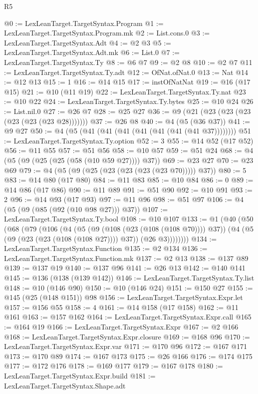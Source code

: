 \begin{lexlean}{R5}
\begin{coremodule}
@0 := LexLeanTarget.TargetSyntax.Program
@1 := LexLeanTarget.TargetSyntax.Program.mk
@2 := List.cons.{0}
@3 := LexLeanTarget.TargetSyntax.Adt
@4 := @2 @3
@5 := LexLeanTarget.TargetSyntax.Adt.mk
@6 := List.{0}
@7 := LexLeanTarget.TargetSyntax.Ty
@8 := @6 @7
@9 := @2 @8
@10 := @2 @7
@11 := LexLeanTarget.TargetSyntax.Ty.adt
@12 := OfNat.ofNat.{0}
@13 := Nat
@14 := @12 @13
@15 := 1
@16 := @14 @15
@17 := instOfNatNat
@19 := @16 (@17 @15)
@21 := @10 (@11 @19)
@22 := LexLeanTarget.TargetSyntax.Ty.nat
@23 := @10 @22
@24 := LexLeanTarget.TargetSyntax.Ty.bytes
@25 := @10 @24
@26 := List.nil.{0}
@27 := @26 @7
@28 := @25 @27
@36 := @9 (@21 (@23 (@23 (@23 (@23 (@23 (@23 @28)))))))
@37 := @26 @8
@40 := @4 (@5 (@36 @37))
@41 := @9 @27
@50 := @4 (@5 (@41 (@41 (@41 (@41 (@41 (@41 (@41 @37))))))))
@51 := LexLeanTarget.TargetSyntax.Ty.option
@52 := 3
@55 := @14 @52 (@17 @52)
@56 := @11 @55
@57 := @51 @56
@58 := @10 @57
@59 := @51 @24
@68 := @4 (@5 (@9 (@25 (@25 (@58 (@10 @59 @27)))) @37))
@69 := @23 @27
@70 := @23 @69
@79 := @4 (@5 (@9 (@25 (@23 (@23 (@23 (@23 @70))))) @37))
@80 := 5
@83 := @14 @80 (@17 @80)
@84 := @11 @83
@85 := @10 @84
@86 := 0
@89 := @14 @86 (@17 @86)
@90 := @11 @89
@91 := @51 @90
@92 := @10 @91
@93 := 2
@96 := @14 @93 (@17 @93)
@97 := @11 @96
@98 := @51 @97
@106 := @4 (@5 (@9 (@85 (@92 (@10 @98 @27))) @37))
@107 := LexLeanTarget.TargetSyntax.Ty.bool
@108 := @10 @107
@133 := @1
    (@40
      (@50
        (@68
          (@79
            (@106
              (@4
                (@5 (@9 (@108 (@23 (@108 (@108 @70)))) @37))
                (@4 (@5 (@9 (@23 (@23 (@108 (@108 @27)))) @37)) (@26 @3))))))))
@134 := LexLeanTarget.TargetSyntax.Function
@135 := @2 @134
@136 := LexLeanTarget.TargetSyntax.Function.mk
@137 := @2 @13
@138 := @137 @89
@139 := @137 @19
@140 := @137 @96
@141 := @26 @13
@142 := @140 @141
@145 := @136 (@138 (@139 @142))
@146 := LexLeanTarget.TargetSyntax.Ty.list
@148 := @10 (@146 @90)
@150 := @10 (@146 @24)
@151 := @150 @27
@155 := @145 (@25 (@148 @151)) @98
@156 := LexLeanTarget.TargetSyntax.Expr.let
@157 := @156 @55
@158 := 4
@161 := @14 @158 (@17 @158)
@162 := @11 @161
@163 := @157 @162
@164 := LexLeanTarget.TargetSyntax.Expr.call
@165 := @164 @19
@166 := LexLeanTarget.TargetSyntax.Expr
@167 := @2 @166
@168 := LexLeanTarget.TargetSyntax.Expr.closure
@169 := @168 @96
@170 := LexLeanTarget.TargetSyntax.Expr.var
@171 := @170 @96
@172 := @167 @171
@173 := @170 @89
@174 := @167 @173
@175 := @26 @166
@176 := @174 @175
@177 := @172 @176
@178 := @169 @177
@179 := @167 @178
@180 := LexLeanTarget.TargetSyntax.Expr.build
@181 := LexLeanTarget.TargetSyntax.Shape.adt

\end{coremodule}
\end{lexlean}
